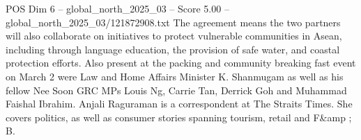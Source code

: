 \begin{textsample}{POS Dim 6 – global\_north\_2025\_03 – Score 5.00 – global\_north\_2025\_03/121872908.txt}
The agreement means the two partners will also collaborate on initiatives to protect vulnerable communities in Asean, including through language education, the provision of safe water, and coastal protection efforts.
Also present at the packing and community breaking fast event on March 2 were Law and Home Affairs Minister K.
Shanmugam as well as his fellow Nee Soon GRC MPs Louis Ng, Carrie Tan, Derrick Goh and Muhammad Faishal Ibrahim.
Anjali Raguraman is a correspondent at The Straits Times.
She covers politics, as well as consumer stories spanning tourism, retail and F\&amp ; B.

\end{textsample}
